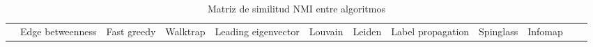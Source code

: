 \documentclass[
  letterpaper,
  DIV=11,
  numbers=noendperiod]{scrreprt}
\begin{document}
\begin{longtable}[]{@{}
  >{\raggedright\arraybackslash}p{}
  >{\raggedleft\arraybackslash}p{}
  >{\raggedleft\arraybackslash}p{}
  >{\raggedleft\arraybackslash}p{}
  >{\raggedleft\arraybackslash}p{}
  >{\raggedleft\arraybackslash}p{}
  >{\raggedleft\arraybackslash}p{}
  >{\raggedleft\arraybackslash}p{}
  >{\raggedleft\arraybackslash}p{}
  >{\raggedleft\arraybackslash}p{}
  >{\raggedleft\arraybackslash}p{}
  >{\raggedleft\arraybackslash}p{}@{}}
\caption{Matriz de similitud NMI entre algoritmos}\tabularnewline
\toprule\noalign{}
\begin{minipage}[b]{\linewidth}\raggedright
\end{minipage} & \begin{minipage}[b]{\linewidth}\raggedleft
Edge betweenness
\end{minipage} & \begin{minipage}[b]{\linewidth}\raggedleft
Fast greedy
\end{minipage} & \begin{minipage}[b]{\linewidth}\raggedleft
Walktrap
\end{minipage} & \begin{minipage}[b]{\linewidth}\raggedleft
Leading eigenvector
\end{minipage} & \begin{minipage}[b]{\linewidth}\raggedleft
Louvain
\end{minipage} & \begin{minipage}[b]{\linewidth}\raggedleft
Leiden
\end{minipage} & \begin{minipage}[b]{\linewidth}\raggedleft
Label propagation
\end{minipage} & \begin{minipage}[b]{\linewidth}\raggedleft
Spinglass
\end{minipage} & \begin{minipage}[b]{\linewidth}\raggedleft
Infomap
\end{minipage} & \begin{minipage}[b]{\linewidth}\raggedleft

\end{minipage}
\end{longtable}
\end{document}
